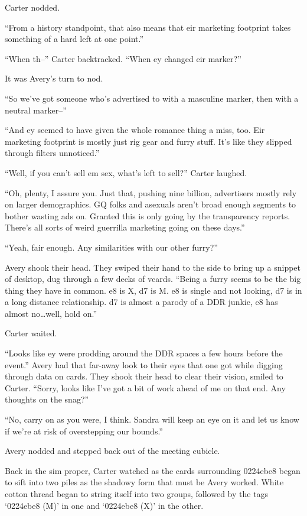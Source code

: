 Carter nodded.

``From a history standpoint, that also means that eir marketing footprint takes something of a hard left at one point.''

``When th--'' Carter backtracked. ``When ey changed eir marker?''

It was Avery's turn to nod.

``So we've got someone who's advertised to with a masculine marker, then with a neutral marker--''

``And ey seemed to have given the whole romance thing a miss, too. Eir marketing footprint is mostly just rig gear and furry stuff. It's like they slipped through filters unnoticed.''

``Well, if you can't sell em sex, what's left to sell?'' Carter laughed.

``Oh, plenty, I assure you. Just that, pushing nine billion, advertisers mostly rely on larger demographics. GQ folks and asexuals aren't broad enough segments to bother wasting ads on. Granted this is only going by the transparency reports. There's all sorts of weird guerrilla marketing going on these days.''

``Yeah, fair enough. Any similarities with our other furry?''

Avery shook their head. They swiped their hand to the side to bring up a snippet of desktop, dug through a few decks of vcards. ``Being a furry seems to be the big thing they have in common. e8 is X, d7 is M. e8 is single and not looking, d7 is in a long distance relationship. d7 is almost a parody of a DDR junkie, e8 has almost no\ldots{}well, hold on.''

Carter waited.

``Looks like ey were prodding around the DDR spaces a few hours before the event.'' Avery had that far-away look to their eyes that one got while digging through data on cards. They shook their head to clear their vision, smiled to Carter. ``Sorry, looks like I've got a bit of work ahead of me on that end. Any thoughts on the snag?''

``No, carry on as you were, I think. Sandra will keep an eye on it and let us know if we're at risk of overstepping our bounds.''

Avery nodded and stepped back out of the meeting cubicle.

Back in the sim proper, Carter watched as the cards surrounding 0224ebe8 began to sift into two piles as the shadowy form that must be Avery worked. White cotton thread began to string itself into two groups, followed by the tags `0224ebe8 (M)' in one and `0224ebe8 (X)' in the other.

